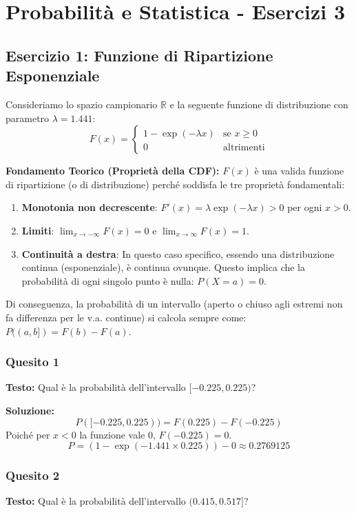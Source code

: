 \documentclass[12pt, a4paper]{article}
\begin{document}
\section*{Probabilità e Statistica - Esercizi 3}

\subsection*{Esercizio 1: Funzione di Ripartizione Esponenziale}
Consideriamo lo spazio campionario $\mathbb{R}$ e la seguente funzione di distribuzione con parametro $\lambda = 1.441$:
$$
F(x) = 
\begin{cases} 
1 - \exp(-\lambda x) & \text{se } x \ge 0 \\
0 & \text{altrimenti}
\end{cases}
$$

\textbf{Fondamento Teorico (Proprietà della CDF):}
$F(x)$ è una valida funzione di ripartizione (o di distribuzione) perché soddisfa le tre proprietà fondamentali:
\begin{enumerate}
    \item \textbf{Monotonia non decrescente}: $F'(x) = \lambda \exp(-\lambda x) > 0$ per ogni $x > 0$.
    \item \textbf{Limiti}: $\lim_{x \to -\infty} F(x) = 0$ e $\lim_{x \to \infty} F(x) = 1$.
    \item \textbf{Continuità a destra}: In questo caso specifico, essendo una distribuzione continua (esponenziale), è continua ovunque. Questo implica che la probabilità di ogni singolo punto è nulla: $P(X = a) = 0$.
\end{enumerate}
Di conseguenza, la probabilità di un intervallo (aperto o chiuso agli estremi non fa differenza per le v.a. continue) si calcola sempre come: $P((a,b]) = F(b) - F(a)$.

\subsubsection*{Quesito 1}
\textbf{Testo:} Qual è la probabilità dell'intervallo $[-0.225, 0.225)$?

\textbf{Soluzione:}
$$P([-0.225, 0.225)) = F(0.225) - F(-0.225)$$
Poiché per $x < 0$ la funzione vale 0, $F(-0.225) = 0$.
$$P = (1 - \exp(-1.441 \times 0.225)) - 0 \approx 0.2769125$$

\subsubsection*{Quesito 2}
\textbf{Testo:} Qual è la probabilità dell'intervallo $(0.415, 0.517]$?
\end{document}
